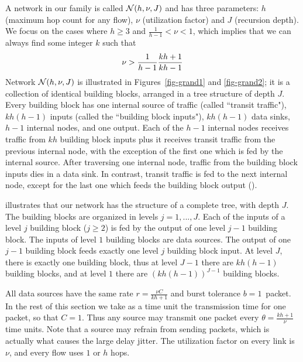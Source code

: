 A network in our family is called $\mathcal N(h, \nu, J)$ and has three
parameters: $h$ (maximum hop count for any flow), $\nu$
(utilization factor) and $J$ (recursion depth). We focus on the
cases where $h \geq 3$ and $\frac{1}{h-1}< \nu <1$, which implies
that we can always find some integer $k$ such that
\begin{equation}\mylabel{eqk}
  \nu > \frac{1}{h-1}\frac{kh+1}{kh-1}
\end{equation}
Network $\mathcal N(h, \nu, J)$ is illustrated in
Figures~\ref{fig-grand1} and \ref{fig-grand2}; it is a collection
of identical building blocks, arranged in a tree structure of
depth $J$. Every building block has one internal source of traffic
(called ``transit traffic"), $kh(h-1)$ inputs (called the
``building block inputs"), $kh(h-1)$ data sinks, $h-1$ internal
nodes, and one output. Each of the $h-1$ internal nodes receives
traffic from $kh$ building block inputs plus it receives transit
traffic from the previous internal node, with the exception of the
first one which is fed by the internal source. After traversing
one internal node, traffic from the building block inputs dies in
a data sink. In contrast, transit traffic is fed to the next
internal node, except for the last one which feeds the building
block output ().
\begin{figure}[!htbp]
\end{figure}
 illustrates that our network has the structure
of a complete tree, with depth $J$. The building blocks are
organized in levels $j=1,...,J$. Each of the inputs of a level $j$
building block ($j\geq 2$) is fed by the output of one level $j-1$
building block. The inputs of level $1$ building blocks are data
sources. The output of one $j-1$ building block feeds exactly one
level $j$ building block input. At level $J$, there is exactly one
building block, thus at level $J-1$ there are $kh(h-1)$ building
blocks, and at level $1$ there are $(kh(h-1))^{J-1}$ building
blocks.
\begin{figure}[!htbp]
\end{figure}
All data sources have the same rate $r=\frac{\nu C}{kh+1}$ and
burst tolerance $b=1$~packet. In the rest of this section we take
as a time unit the transmission time for one packet, so that
$C=1$. Thus any source may transmit one packet every $\theta =
\frac{kh+1}{\nu}$ time units. Note that a source may refrain from
sending packets, which is actually what causes the large delay
jitter. The utilization factor on every link is $\nu$, and every
flow uses $1$ or $h$ hops.

